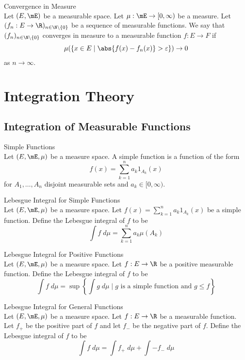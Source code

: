 \documentclass[a4paper]{article}
\begin{document}
\begin{defn}{Convergence in Measure}{}\\
Let $(E,\mE)$ be a measurable space. Let $\mu:\mE\to[0,\infty)$ be a measure. Let $(f_n:E\to \R)_{n\in\N\setminus\{0\}}$ be a sequence of measurable functions. We say that $(f_n)_{n\in\N\setminus\{0\}}$ converges in measure to a measurable function $f:E\to F$ if $$\mu(\{x\in E\;|\;\abs{f(x)-f_n(x)}>\varepsilon\})\to0$$ as $n\to\infty$. 
\end{defn}

\pagebreak
\section{Integration Theory}
\subsection{Integration of Measurable Functions}
\begin{defn}{Simple Functions}{}\\
Let $(E,\mE,\mu)$ be a measure space. A simple function is a function of the form $$f(x)=\sum_{k=1}^na_k1_{A_k}(x)$$ for $A_1,\dots,A_n$ disjoint measurable sets and $a_k\in[0,\infty)$. 
\end{defn}

\begin{defn}{Lebesgue Integral for Simple Functions}{}\\
Let $(E,\mE,\mu)$ be a measure space. Let $f(x)=\sum_{k=1}^na_k1_{A_k}(x)$ be a simple function. Define the Lebesgue integral of $f$ to be $$\int f\;d\mu=\sum_{k=1}^na_k\mu(A_k)$$
\end{defn}

\begin{lmm}{}{}
\end{lmm}

\begin{defn}{Lebesgue Integral for Positive Functions}{}\\
Let $(E,\mE,\mu)$ be a measure space. Let $f:E\to\R$ be a positive measurable function. Define the Lebesgue integral of $f$ to be $$\int f\;d\mu=\sup\left\{\int g\;d\mu\;|\;g\text{ is a simple function and }g\leq f\right\}$$
\end{defn}

\begin{defn}{Lebesgue Integral for General Functions}{}\\
Let $(E,\mE,\mu)$ be a measure space. Let $f:E\to\R$ be a measurable function. Let $f_+$ be the positive part of $f$ and let $f_-$ be the negative part of $f$. Define the Lebesgue integral of $f$ to be $$\int f\;d\mu=\int f_+\;d\mu+\int -f_-\;d\mu$$
\end{defn}
\end{document}
